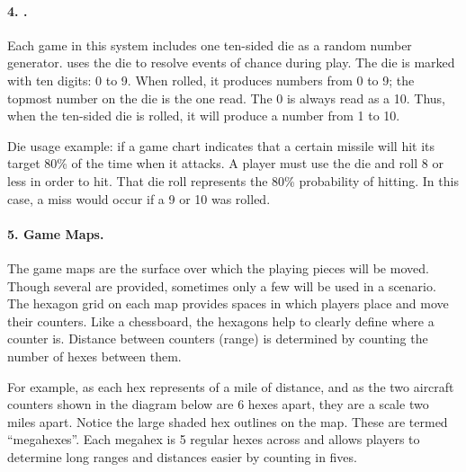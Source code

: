 \paragraph{4. \protect{}.} Each game in this system includes one ten-sided die as a random number generator. {\AirPow} uses the die to resolve events of chance during play. The die is marked with ten digits: 0 to 9. When rolled, it produces numbers from 0 to 9; the topmost number on the die is the one read. The 0 is always read as a 10. Thus, when the ten-sided die is rolled, it will produce a number from 1 to 10.

Die usage example: if a game chart indicates that a certain missile will hit its target 80\% of the time when it attacks. A player must use the die and roll 8 or less in order to hit. That die roll represents the 80\% probability of hitting. In this case, a miss would occur if a 9 or 10 was rolled.

\paragraph{5. Game Maps.} The game maps are the surface over which the playing pieces will be moved. Though several are provided, sometimes only a few will be used in a scenario. The hexagon grid on each map provides spaces in which players place and move their counters. Like a chessboard, the hexagons help to clearly define where a counter is. Distance between counters (range) is determined by counting the number of hexes between them.

For example, as each hex represents {\onethird} of a mile of distance, and as the two aircraft counters shown in the diagram below are 6 hexes apart, they are a scale two miles apart. 
Notice the large shaded hex outlines on the map. These are termed “megahexes”. Each megahex is 5 regular hexes across and allows players to determine long ranges and distances easier by counting in fives. 

